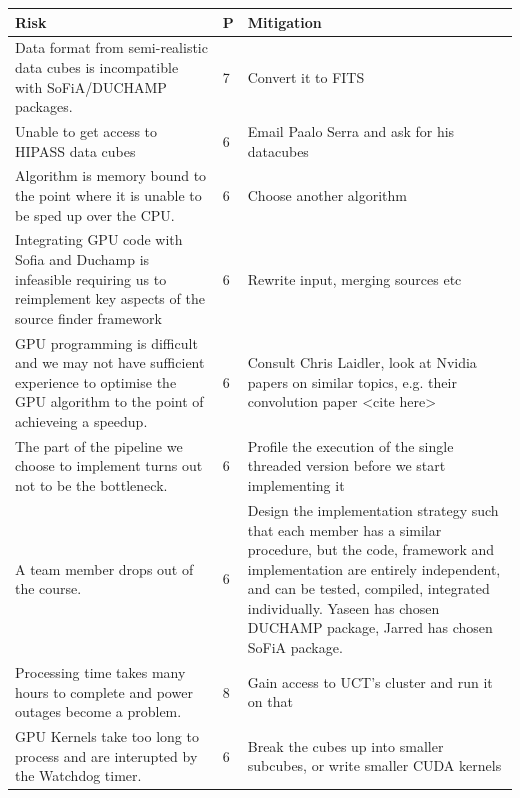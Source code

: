 \documentclass[prodmode,acmtecs]{acmsmall} \usepackage[ruled]{algorithm2e}
\begin{document}
\begin{center}
    \begin{tabular}{| p{6cm} | p{0.5cm} | p{6cm} |}
    
    \hline
    Risk & P & Mitigation \\ \hline

    Data format from semi-realistic data cubes is incompatible with
    SoFiA/DUCHAMP packages. & 7 & Convert it to FITS \\ \hline

    Unable to get access to HIPASS data cubes & 6 & Email Paalo Serra and ask for his datacubes \\ \hline

    Algorithm is memory bound to the point where it is unable to be sped up over the CPU. & 6 & Choose another algorithm \\ \hline

    Integrating GPU code with Sofia and Duchamp is infeasible requiring us to
    reimplement key aspects of the source finder framework & 6 & Rewrite input, merging sources etc \\ \hline

    GPU programming is difficult and we may not have sufficient experience to optimise the GPU algorithm
    to the point of achieveing a speedup. & 6 & Consult Chris Laidler, look at Nvidia papers on similar topics, e.g. their convolution paper <cite here> \\ \hline

    The part of the pipeline we choose to implement turns out not to be the bottleneck. & 6 & Profile the execution of the single threaded version before we start implementing it\\ \hline

    A team member drops out of the course.& 6 & Design the implementation strategy such that each member has a similar procedure, but the code, framework and implementation are entirely independent, and can be tested, compiled, integrated individually. Yaseen has chosen DUCHAMP package, Jarred has chosen SoFiA package.\\ \hline

    Processing time takes many hours to complete and power outages become a problem.& 8 & Gain access to UCT's cluster and run it on that\\ \hline
    GPU Kernels take too long to process and are interupted by the Watchdog timer. & 6 & Break the cubes up into smaller subcubes, or write smaller CUDA kernels\\ \hline

    \end{tabular}
\end{center}
\end{document}
